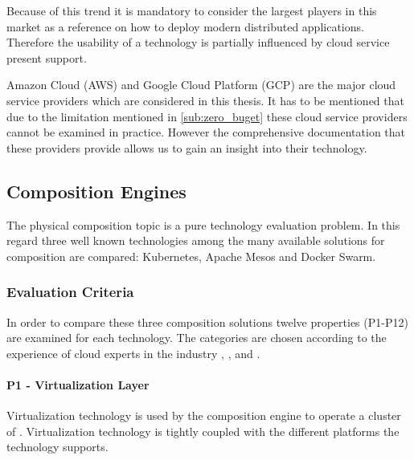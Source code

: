 Because of this trend it is mandatory to consider the largest players in this
market as a reference on how to deploy modern distributed applications. Therefore the
usability of a technology is partially influenced by cloud service present
support. 

Amazon Cloud (AWS) and Google Cloud Platform (GCP) are the major cloud service
providers which are considered in this thesis. It has to be mentioned that due
to the limitation mentioned in \autoref{sub:zero_buget} these cloud service
providers cannot be examined in practice. However the comprehensive
documentation that these providers provide allows us to gain an insight into
their technology.

\newpage
\subsection{Composition Engines}
\label{sub:composition_engines}

The physical \ms{} composition topic is a pure technology evaluation problem.
In this regard three well known technologies among the many available solutions 
for \ms{} composition are compared: Kubernetes, Apache Mesos and Docker Swarm.

\subsubsection{Evaluation Criteria}

In order to compare these three composition solutions twelve properties
(P1-P12) are examined for each technology. The categories are chosen according
to the experience of cloud experts in the industry
\cite{toll2016cloud_expert_eval}, \cite{lerilli2012cloud_eval_criteria}, and
\cite{voras2011evaluating}.


\paragraph{P1 - Virtualization Layer}

Virtualization technology is used by the composition engine to operate a
cluster of \mss{}. Virtualization technology is tightly coupled with the
different platforms the technology supports.

